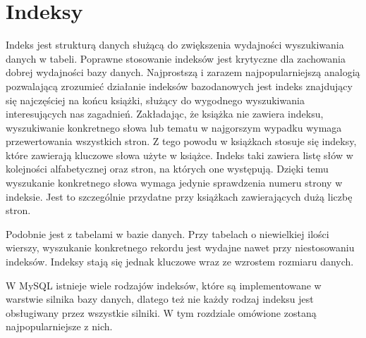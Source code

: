 \section{Indeksy}
Indeks jest strukturą danych służącą do zwiększenia wydajności wyszukiwania danych w tabeli. Poprawne stosowanie indeksów jest krytyczne dla zachowania dobrej wydajności bazy danych.
Najprostszą i zarazem najpopularniejszą analogią pozwalającą zrozumieć działanie indeksów bazodanowych jest indeks znajdujący się najczęściej na końcu książki, służący do wygodnego wyszukiwania interesujących nas zagadnień. Zakładając, że książka nie zawiera indeksu, wyszukiwanie konkretnego słowa lub tematu w najgorszym wypadku wymaga przewertowania wszystkich stron. Z tego powodu w książkach stosuje się indeksy, które zawierają kluczowe słowa użyte w książce. Indeks taki zawiera listę słów w kolejności alfabetycznej oraz stron, na których one występują. Dzięki temu wyszukanie konkretnego słowa wymaga jedynie sprawdzenia numeru strony w indeksie. Jest to szczególnie przydatne przy książkach zawierających dużą liczbę stron. 

Podobnie jest z tabelami w bazie danych. Przy tabelach o niewielkiej ilości wierszy, wyszukanie konkretnego rekordu jest wydajne nawet przy niestosowaniu indeksów. Indeksy stają się jednak kluczowe wraz ze wzrostem rozmiaru danych.

W MySQL istnieje wiele rodzajów indeksów, które są implementowane w warstwie silnika bazy danych, dlatego też nie każdy rodzaj indeksu jest obsługiwany przez wszystkie silniki. W tym rozdziale omówione zostaną najpopularniejsze z nich.



